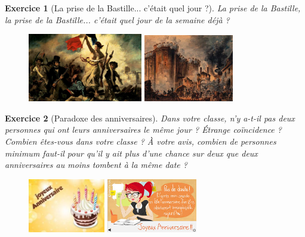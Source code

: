 \documentclass[12pt]{article}
\theoremstyle{break}
\newtheorem{exo}{Exercice}
\begin{document}
\begin{exo}[La prise de la Bastille... c'était quel jour ?]
La prise de la Bastille, la prise de la Bastille... c'était quel jour de la semaine déjà ?

\begin{figure}[h!]
	\centering
	\includegraphics[width=0.445\textwidth]{MarianneGuidantLePeuple.jpg}
    \includegraphics[width=0.35\textwidth]{PriseDeLaBastille.jpg}
\end{figure}
\end{exo}


\begin{exo}[Paradoxe des anniversaires]
Dans votre classe, n'y a-t-il pas deux personnes qui ont leurs anniversaires le même jour ? Étrange coïncidence ? Combien êtes-vous dans votre classe ? À votre avis, combien de personnes minimum faut-il pour qu'il y ait plus d'une chance sur deux que deux anniversaires au moins tombent à la même date ?

\begin{figure}[h!]
	\centering
	\includegraphics[width=0.3\textwidth]{AnniversaireGateau.jpg}
    \includegraphics[width=0.35\textwidth]{ReflexionAnniversaire.jpg}
\end{figure}
\end{exo}
\end{document}
